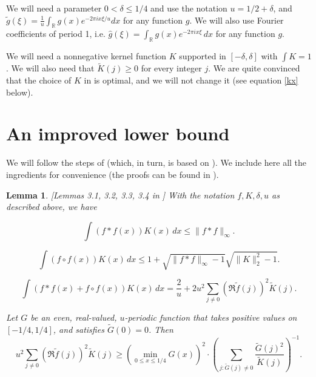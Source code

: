 \documentclass[12pt]{amsart}
\newtheorem{lemma}[theorem]{Lemma}
\theoremstyle{definition}
\newcommand{\R}{\ensuremath{\mathbb{R}}}
\begin{document}
\medskip

We will need a parameter $0 < \delta \le 1/4$ and use the notation
$u=1/2+\delta$, and $\tilde g(\xi)=\frac{1}{u}\int_\R g(x)e^{-2\pi
i x\xi/u}dx$ for any function $g$. We will also use Fourier coefficients
of period 1, i.e. $\hat g(\xi)=\int_\R g(x)e^{-2\pi i x\xi} \, dx$
for any function $g$.

\medskip

We will need a nonnegative kernel function $K$ supported in
$[-\delta, \delta]$ with $\int K=1$. We will also need that
$\tilde K(j)\ge 0$ for every integer $j$. We are quite convinced
that the choice of $K$ in \cite{martin} is optimal, and we will
not change it (see equation \eqref{kx} below).


\section{An improved lower bound}\label{improvedbound}

We will follow the steps of \cite{martin} (which, in turn, is
based on \cite{yu}). We include here all the ingredients for
convenience (the proofs can be found in \cite{martin}).

\begin{lemma}\label{lemma1}{\rm [Lemmas 3.1, 3.2, 3.3, 3.4 in
\cite{martin}]}
With the notation $f, K, \delta, u$ as described above, we have

\medskip

\begin{equation}\label{eq1}\int (f\ast f (x)) K(x) \, dx \le \|f\ast f\|_\infty.
\end{equation}

\medskip

\begin{equation}\label{eq2}\int (f \circ f (x)) K(x) \, dx \le 1+\sqrt{\|f\ast f\|_\infty - 1}\sqrt{\|K\|_2^2-1}.
\end{equation}

\medskip

\begin{equation}\label{eq3}\int (f\ast f (x)+ f\circ f(x)) K(x) \, dx
=\frac{2}{u}+2u^2\sum_{j\ne 0}(\Re \tilde f(j))^2\tilde K(j).
\end{equation}

\medskip

Let $G$ be an even, real-valued, $u$-periodic function that takes
positive values on $[-1/4,1/4]$, and satisfies $\tilde G(0)=0$.
Then
\begin{equation}\label{eq4}
u^2\sum_{j\ne 0}(\Re \tilde f(j))^2\tilde K(j)\ge
\left
(\min_{0\le x\le 1/4} G(x) \right )^2
\cdot \left (
 \sum_{j:
\tilde G(j)\ne 0} \frac{\tilde G(j)^2}{\tilde K(j)} \right )^{-1}.
\end{equation}
\end{lemma}
\end{document}

